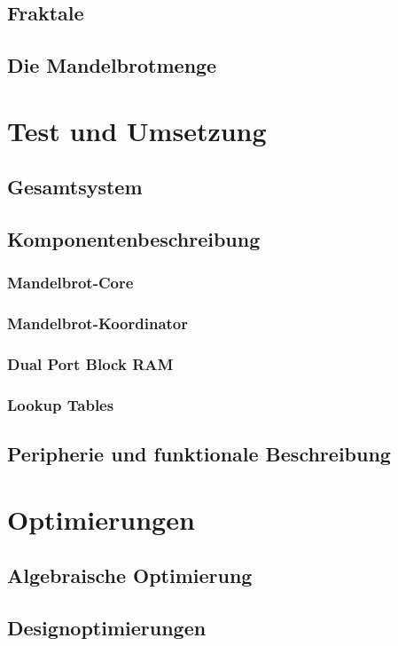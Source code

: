 \documentclass[a4paper,12pt,onesided]{report}
\begin{document}
\section{Fraktale}
\section{Die Mandelbrotmenge}

\chapter{Test und Umsetzung}
	\section{Gesamtsystem}
	\section{Komponentenbeschreibung}
		\subsection{Mandelbrot-Core}
		\subsection{Mandelbrot-Koordinator}
		\subsection{Dual Port Block RAM}
		\subsection{Lookup Tables}
	\section{Peripherie und funktionale Beschreibung}

\chapter{Optimierungen}
	\section{Algebraische Optimierung}
	\section{Designoptimierungen}

{}

\end{document}

